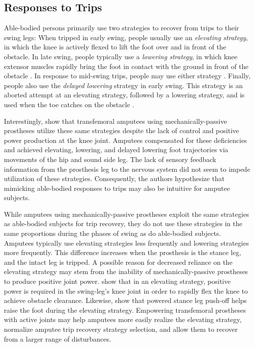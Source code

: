 \subsection{Responses to Trips}
Able-bodied persons primarily use two strategies to recover from trips to their
swing legs: When tripped in early swing, people usually use an
\emph{elevating strategy}, in which the knee is actively flexed to lift the foot
over and in front of the obstacle. In late swing, people typically use a
\emph{lowering strategy}, in which knee extensor muscles rapidly bring the foot
in contact with the ground in front of the obstacle \citep{eng1994strategies}.
In response to mid-swing trips, people may use either strategy
\citep{schillings2000muscular}. Finally, people also use the \emph{delayed
lowering} strategy in early swing. This strategy is an aborted attempt at an
elevating strategy, followed by a lowering strategy, and is used when the toe
catches on the obstacle \citep{eng1994strategies}.

Interestingly, \citet{shirota2015transfemoral} show that transfemoral amputees
using mechanically-passive prostheses utilize these same strategies despite the
lack of control and positive power production at the knee joint. Amputees
compensated for these deficiencies and achieved elevating, lowering, and delayed
lowering foot trajectories via movements of the hip and sound side leg. The lack
of sensory feedback information from the prosthesis leg to the nervous system
did not seem to impede utilization of these strategies.  Consequently, the
authors hypothesize that mimicking able-bodied responses to trips may also be
intuitive for amputee subjects. 

While amputees using mechanically-passive prostheses exploit the same strategies
as able-bodied subjects for trip recovery, they do not use these strategies in
the same proportions during the phases of swing as do able-bodied subjects.
Amputees typically use elevating strategies less frequently and lowering
strategies more frequently. This difference increases when the prosthesis is the
stance leg, and the intact leg is tripped. A possible reason for decreased
reliance on the elevating strategy may stem from the inability of
mechanically-passive prostheses to produce positive joint power.
\citet{cordero2005energy} show that in an elevating strategy, positive power is
required in the swing-leg's knee joint in order to rapidly flex the knee to
achieve obstacle clearance. Likewise, \citet{pijnappels2004contribution} show
that powered stance leg push-off helps raise the foot during the elevating
strategy. Empowering transfemoral prostheses with active joints may help
amputees more easily realize the elevating strategy, normalize amputee trip
recovery strategy selection, and allow them to recover from a larger range of
disturbances.

